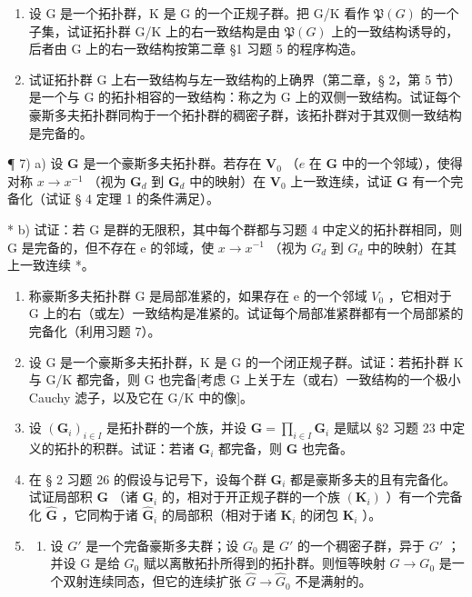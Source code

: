 \begin{enumerate}
\def\labelenumi{\arabic{enumi})}
\setcounter{enumi}{4}
\item
  设 G 是一个拓扑群，K 是 G 的一个正规子群。把 G/K 看作 \(\mathfrak{P}(G)\) 的一个子集，试证拓扑群 G/K 上的右一致结构是由 \(\mathfrak{P}(G)\) 上的一致结构诱导的，后者由 G 上的右一致结构按第二章 §1 习题 5 的程序构造。
\item
  试证拓扑群 G 上右一致结构与左一致结构的上确界（第二章，§ 2，第 5 节）是一个与 G 的拓扑相容的一致结构：称之为 G 上的双侧一致结构。试证每个豪斯多夫拓扑群同构于一个拓扑群的稠密子群，该拓扑群对于其双侧一致结构是完备的。
\end{enumerate}

¶ 7) a) 设 \(\mathbf{G}\) 是一个豪斯多夫拓扑群。若存在 \(\mathbf{V}_0\) （\(e\) 在 \(\mathbf{G}\) 中的一个邻域），使得对称 \(x \to x^{-1}\) （视为 \(\mathbf{G}_d\) 到 \(\mathbf{G}_d\) 中的映射）在 \(\mathbf{V}_0\) 上一致连续，试证 \(\mathbf{G}\) 有一个完备化（试证 § 4 定理 1 的条件满足）。

* b) 试证：若 G 是群的无限积，其中每个群都与习题 4 中定义的拓扑群相同，则 G 是完备的，但不存在 e 的邻域，使 \(x \rightarrow x^{-1}\) （视为 \(G_{d}\) 到 \(G_{d}\) 中的映射）在其上一致连续 *。

\begin{enumerate}
\def\labelenumi{\arabic{enumi})}
\setcounter{enumi}{7}
\item
  称豪斯多夫拓扑群 G 是局部准紧的，如果存在 e 的一个邻域 \(V_{0}\) ，它相对于 G 上的右（或左）一致结构是准紧的。试证每个局部准紧群都有一个局部紧的完备化（利用习题 7）。
\item
  设 G 是一个豪斯多夫拓扑群，K 是 G 的一个闭正规子群。试证：若拓扑群 K 与 G/K 都完备，则 G 也完备{[}考虑 G 上关于左（或右）一致结构的一个极小 Cauchy 滤子，以及它在 G/K 中的像{]}。
\item
  设 \((\mathbf{G}_i)_{i\in I}\) 是拓扑群的一个族，并设 \(\mathbf{G} = \prod_{i\in I}\mathbf{G}_i\) 是赋以 §2 习题 23 中定义的拓扑的积群。试证：若诸 \(\mathbf{G}_i\) 都完备，则 \(\mathbf{G}\) 也完备。
\item
  在 § 2 习题 26 的假设与记号下，设每个群 \(\mathbf{G}_{i}\) 都是豪斯多夫的且有完备化。试证局部积 \(\mathbf{G}\) （诸 \(\mathbf{G}_{i}\) 的，相对于开正规子群的一个族 \((\mathbf{K}_{i})\) ）有一个完备化 \(\hat{\mathbf{G}}\) ，它同构于诸 \(\hat{\mathbf{G}}_{i}\) 的局部积（相对于诸 \(\mathbf{K}_{i}\) 的闭包 \(\mathbf{K}_{i}\) ）。
\item
  \begin{enumerate}
  \def\labelenumii{\alph{enumii})}
  \tightlist
  \item
    设 \(G'\) 是一个完备豪斯多夫群；设 \(G_{0}\) 是 \(G'\) 的一个稠密子群，异于 \(G'\) ；并设 G 是给 \(G_{0}\) 赋以离散拓扑所得到的拓扑群。则恒等映射 \(G \rightarrow G_{0}\) 是一个双射连续同态，但它的连续扩张 \(\hat{G} \rightarrow \hat{G}_{0}\) 不是满射的。
  \end{enumerate}
\end{enumerate}

